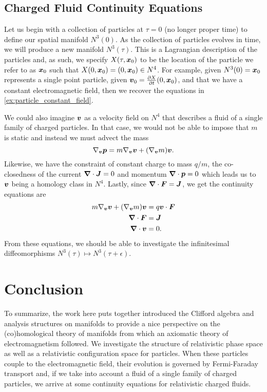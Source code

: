 \documentclass[conf]{new-aiaa}
\begin{document}
\subsection{Charged Fluid Continuity Equations}
\label{subsec:charged_fluid}

Let us begin with a collection of particles at $\tau=0$ (no longer proper time) to define our spatial manifold $N^3(0)$. As the collection of particles evolves in time, we will produce a new manifold $N^3(\tau)$. This is a Lagrangian description of the particles and, as such, we specify $X(\tau, \boldsymbol{x}_0)$ to be the location of the particle we refer to as $\boldsymbol{x}_0$ such that $X(0,\boldsymbol{x}_0)=(0,\boldsymbol{x}_0)\in N^4$. For example, given $N^3(0)=\boldsymbol{x}_0$ represents a single point particle, given $\boldsymbol{v}_0=\frac{\partial X}{\partial t}(0,\boldsymbol{x}_0)$, and that we have a constant electromagnetic field, then we recover the equations in \cref{ex:particle_constant_field}.

We could also imagine ${\boldsymbol{v}}$ as a velocity field on $N^4$ that describes a fluid of a single family of charged particles. In that case, we would not be able to impose that $m$ is static and instead we must advect the mass
\begin{equation}
   \nabla_{\boldsymbol{v}} \boldsymbol{p} = m \nabla_{\boldsymbol{v}} \boldsymbol{v} + (\nabla_{\boldsymbol{v}} m)\boldsymbol{v}.
\end{equation}
Likewise, we have the constraint of constant charge to mass $q/m$, the co-closedness of the current $\boldsymbol{\nabla} \cdot \boldsymbol{J}=0$ and momentum $\boldsymbol{\nabla} \cdot \boldsymbol{p}=0$ which leads us to $\boldsymbol{v}$ being a homology class in $N^4$. Lastly, since $\boldsymbol{\nabla} \cdot \boldsymbol{F} = \boldsymbol{J}$, we get the continuity equations are
\begin{align}
    m \nabla_{\boldsymbol{v}} \boldsymbol{v} + (\nabla_{\boldsymbol{v}} m)\boldsymbol{v} &= q \boldsymbol{v} \cdot \boldsymbol{F}\\
    \boldsymbol{\nabla} \cdot \boldsymbol{F} &= \boldsymbol{J}\\
    \boldsymbol{\nabla} \cdot \boldsymbol{v} &= 0.
\end{align}
From these equations, we should be able to investigate the infinitesimal diffeomorphisms $N^3(\tau)\mapsto N^3(\tau+\epsilon)$.

\section{Conclusion}

To summarize, the work here puts together introduced the Clifford algebra and analysis structures on manifolds to provide a nice perspective on the (co)homological theory of manifolds from which an axiomatic theory of electromagnetism followed. We investigate the structure of relativistic phase space as well as a relativistic configuration space for particles. When these particles couple to the electromagnetic field, their evolution is governed by Fermi-Faraday transport and, if we take into account a fluid of a single family of charged particles, we arrive at some continuity equations for relativistic charged fluids.
\end{document}
